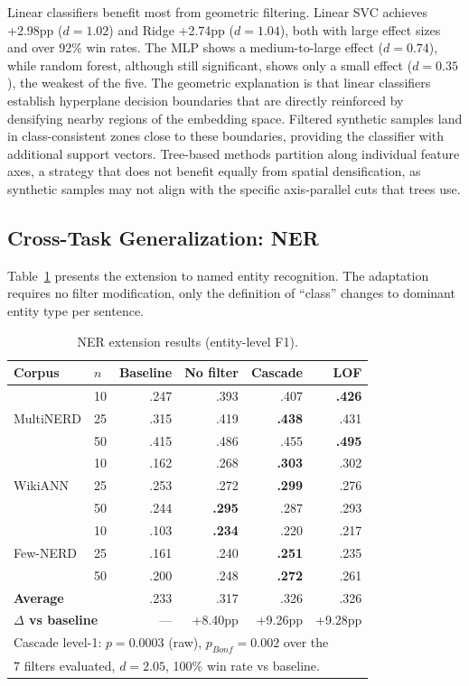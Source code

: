 \documentclass[conference]{IEEEtran}
\begin{document}
Linear classifiers benefit most from geometric filtering. Linear SVC achieves +2.98pp ($d=1.02$) and Ridge +2.74pp ($d=1.04$), both with large effect sizes and over 92\% win rates. The MLP shows a medium-to-large effect ($d=0.74$), while random forest, although still significant, shows only a small effect ($d=0.35$), the weakest of the five. The geometric explanation is that linear classifiers establish hyperplane decision boundaries that are directly reinforced by densifying nearby regions of the embedding space. Filtered synthetic samples land in class-consistent zones close to these boundaries, providing the classifier with additional support vectors. Tree-based methods partition along individual feature axes, a strategy that does not benefit equally from spatial densification, as synthetic samples may not align with the specific axis-parallel cuts that trees use.

\subsection{Cross-Task Generalization: NER}

Table~\ref{tab:ner} presents the extension to named entity recognition. The adaptation requires no filter modification, only the definition of ``class'' changes to dominant entity type per sentence.

\begin{table}[t]
\centering
\caption{NER extension results (entity-level F1).}
\label{tab:ner}
\small
\setlength{\tabcolsep}{4pt}
\begin{tabular}{llrrrr}
\toprule
\textbf{Corpus} & \textbf{$n$} & \textbf{Baseline} & \textbf{No filter} & \textbf{Cascade} & \textbf{LOF} \\
\midrule
\multirow{3}{*}{MultiNERD}
 & 10 & .247 & .393 & .407 & \textbf{.426} \\
 & 25 & .315 & .419 & \textbf{.438} & .431 \\
 & 50 & .415 & .486 & .455 & \textbf{.495} \\
\midrule
\multirow{3}{*}{WikiANN}
 & 10 & .162 & .268 & \textbf{.303} & .302 \\
 & 25 & .253 & .272 & \textbf{.299} & .276 \\
 & 50 & .244 & \textbf{.295} & .287 & .293 \\
\midrule
\multirow{3}{*}{Few-NERD}
 & 10 & .103 & \textbf{.234} & .220 & .217 \\
 & 25 & .161 & .240 & \textbf{.251} & .235 \\
 & 50 & .200 & .248 & \textbf{.272} & .261 \\
\midrule
\multicolumn{2}{l}{\textbf{Average}} & .233 & .317 & .326 & .326 \\
\multicolumn{2}{l}{\textbf{$\Delta$ vs baseline}} & --- & +8.40pp & +9.26pp & +9.28pp \\
\bottomrule
\multicolumn{6}{l}{\footnotesize Cascade level-1: $p=0.0003$ (raw), $p_{Bonf}=0.002$ over the} \\
\multicolumn{6}{l}{\footnotesize 7 filters evaluated, $d=2.05$, 100\% win rate vs baseline.}
\end{tabular}
\end{table}
\end{document}
